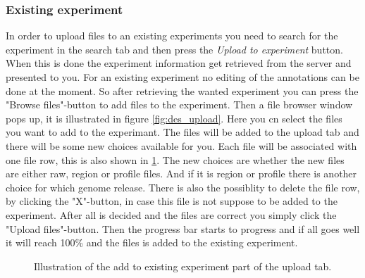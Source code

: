 \subsubsection{Existing experiment}
\label{sec:des_exists}
In order to upload files to an existing experiments you need to search for the experiment in the search tab and then press the \emph{Upload to experiment} button. When this is done the experiment information get retrieved from the server and presented to you. For an existing experiment no editing of the annotations can be done at the moment. So after retrieving the wanted experiment you can press the "Browse files"-button to add files to the experiment. Then a file browser window pops up, it is illustrated in figure \ref{fig:des_upload}. Here you cn select the files you want to add to the experimant. The files will be added to the upload tab and there will be some new choices available for you. Each file  will be associated with one file row, this is also shown in \ref{fig:des_upload-exists}. The new choices are whether the new files are either raw, region or profile files. And if it is region or profile there is another choice for which genome release. There is also the possiblity to delete the file row, by clicking the "X"-button, in case this file is not suppose to be added to the experiment. After all is decided and the files are correct you simply click the "Upload files"-button. Then the progress bar starts to progress and if all goes well it will reach 100\% and the files is added to the existing experiment.

\begin{figure}[h!]
	\caption{Illustration of the add to existing experiment part of the upload tab.}
	\label{fig:des_upload-exists}
\end{figure}
\newpage
